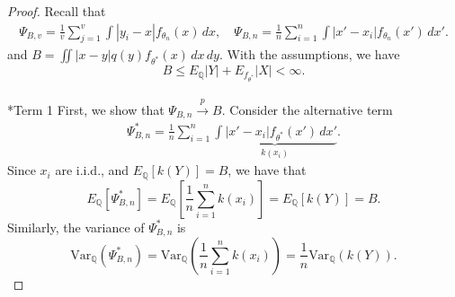 \documentclass[11pt,a4paper]{article}
\makeatletter
\let\oldparagraph\paragraph
\renewcommand{\paragraph}{
    \@ifstar
      \xxxParagraphStar
      \xxxParagraphNoStar
  }
\newcommand{\xxxParagraphStar}[1]{\oldparagraph*{#1}\mbox{}}
\newcommand{\xxxParagraphNoStar}[1]{\oldparagraph{#1}\mbox{}}
\theoremstyle{plain}
\theoremstyle{remark}
\theoremstyle{remark}
\makeatother
\begin{document}
\begin{proof}
Recall that  
\begin{align*}
    \Psi_{B,v} = \frac{1}{v}\sum_{j = 1}^v \int  |y_i-x|  f_{\theta_n}(x) \,dx,\quad \Psi_{B,n} = \frac{1}{n}\sum_{i = 1}^n \int \left| x' - x_i\right|f_{\theta_n}(x')\,dx'.
\end{align*}
and $B = \iint \left|x - y \right| q(y) f_{\theta^*}(x) \, dx\,dy$.
With the assumptions, we have $$B\leq E_{\mathbb{Q}}|Y|+E_{f_{\theta^*}}|X|<\infty.$$

\paragraph*{Term 1} First, we show that $\Psi_{B,n}\overset{p}{\to}B$. Consider the alternative term
\begin{align*}
    \Psi^*_{B,n} = \frac{1}{n}\sum_{i = 1}^n\underbrace{\int \left|x' - x_i \right|f_{\theta^*}(x')\, dx'}_{k(x_i)}.
\end{align*}
 Since  \( x_i \) are i.i.d., and \( E_{\mathbb{Q}}[k(Y)] = B \), we have that
  \[
  E_{\mathbb{Q}}[\Psi^*_{B,n}] = E_{\mathbb{Q}}\left[ \frac{1}{n} \sum_{i=1}^n k(x_i) \right]  =   E_{\mathbb{Q}}\left[k(Y)\right] = B .
  \]
  Similarly, the variance of $\Psi^*_{B,n}$ is
\[
\text{Var}_{\mathbb{Q}}(\Psi^*_{B,n}) = \text{Var}_{\mathbb{Q}}\left( \frac{1}{n} \sum_{i=1}^n k(x_i) \right) = \frac{1}{n} \text{Var}_{\mathbb{Q}}(k(Y)).
\]


\end{proof}
\end{document}
